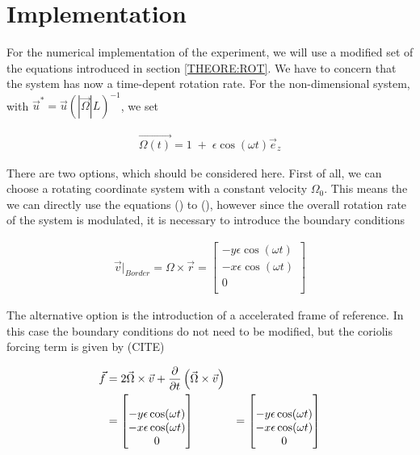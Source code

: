 \newpage

\section{Implementation}

For the numerical implementation of the experiment, we will use a modified set of the equations
introduced in section \ref{THEORE:ROT}.
We have to concern that the system has now a time-depent rotation rate.
For the non-dimensional system, with $\vec{u}^* =  \vec{u} (|\vec{\Omega}|L)^{-1}$, we set

\begin{align}
    \vec{\Omega(t)} = 1 \; + \; \epsilon \cos(\omega t)\vec{e}_z
\end{align}

There are two options, which should be considered here.
First of all, we can choose a rotating coordinate system with a constant velocity $\Omega_0$.
This means the we can directly use the equations () to (), however since the overall rotation rate of the system is
modulated, it is necessary to introduce the boundary conditions

\begin{align}
    \vec{v}|_{Border}  = \Omega \times \vec{r} = \begin{bmatrix}
           -y \epsilon \cos(\omega t) \\
           -x \epsilon \cos(\omega t) \\
           0\\
         \end{bmatrix}
\end{align}

The alternative option is the introduction of a accelerated frame of reference.
In this case the boundary conditions do not need to be modified, but the coriolis forcing term is given by (CITE)

\begin{align}
    \vec{f} &= 2 \vec{\Omega} \times \vec{v} + \pdn[]{t}\left(\vec{\Omega} \times \vec{v} \right) \\
            &= \begin{bmatrix}\\
           -y \epsilon \cos(\omega t) \\
           -x \epsilon \cos(\omega t) \\
           0\\
         \end{bmatrix}
            &= \begin{bmatrix}\\
           -y \epsilon \cos(\omega t) \\
           -x \epsilon \cos(\omega t) \\
           0\\
         \end{bmatrix}
\end{align}

